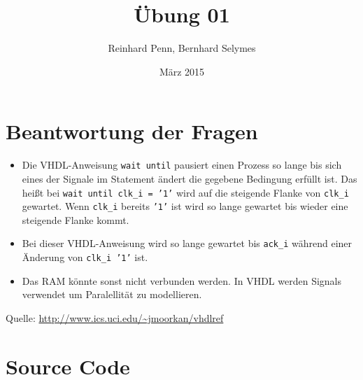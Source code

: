 \documentclass[12pt,a4paper]{article}
\begin{document}
\title{Übung 01}
\author{Reinhard Penn, Bernhard Selymes}
\date{März 2015}

\normalsize




\newcommand{\Uebung}{BFMVHDL}
\newcommand{\srcpath}{../../src}
\newcommand{\simpath}{../../sim}



\section{Beantwortung der Fragen}

\begin{itemize}
	\item Die VHDL-Anweisung \texttt{wait until} pausiert einen Prozess so lange bis sich eines der Signale im Statement ändert die gegebene Bedingung erfüllt ist. 
	Das heißt bei \texttt{wait until clk\_i = '1'} wird auf die steigende Flanke von \texttt{clk\_i} gewartet. Wenn \texttt{clk\_i} bereits \texttt{'1'} ist wird so lange gewartet bis wieder eine steigende Flanke kommt.
	\item Bei dieser VHDL-Anweisung wird so lange gewartet bis \texttt{ack\_i} während einer Änderung von \texttt{clk\_i '1'} ist.
	\item Das RAM könnte sonst nicht verbunden werden. In VHDL werden Signals verwendet um Paralellität zu modellieren.
\end{itemize}

Quelle: \url{http://www.ics.uci.edu/~jmoorkan/vhdlref}

\section{Source Code}






\end{document}
